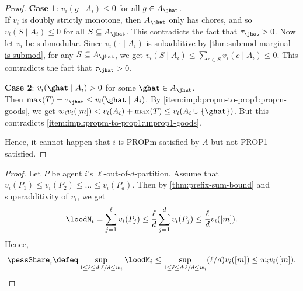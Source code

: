 \begin{proof}
\textbf{Case 1}: $v_i(g \mid A_i) \le 0$ for all $g \in A_{\jhat}$.
\\ If $v_i$ is doubly strictly monotone, then $A_{\jhat}$ only has chores,
and so $v_i(S \mid A_i) \le 0$ for all $S \subseteq A_{\jhat}$.
This contradicts the fact that $\tau_{\jhat} > 0$.
Now let $v_i$ be submodular.
Since $v_i(\cdot \mid A_i)$ is subadditive by \cref{thm:submod-marginal-is-submod},
for any $S \subseteq A_{\jhat}$, we get
$v_i(S \mid A_i) \le \sum_{c \in S} v_i(c \mid A_i) \le 0$.
This contradicts the fact that $\tau_{\jhat} > 0$.

\textbf{Case 2}: $v_i(\ghat \mid A_i) > 0$ for some $\ghat \in A_{\jhat}$.
\\ Then $\max(T) = \tau_{\jhat} \le v_i(\ghat \mid A_i)$.
By \ref{item:impl:propm-to-prop1:propm-goods}, we get
$w_iv_i([m]) < v_i(A_i) + \max(T) \le v_i(A_i \cup \{\ghat\})$.
But this contradicts \ref{item:impl:propm-to-prop1:unprop1-goods}.

Hence, it cannot happen that $i$ is PROPm-satisfied by $A$ but not PROP1-satisfied.
\end{proof}

\begin{proof}
Let $P$ be agent $i$'s $\ell$-out-of-$d$-partition.
Assume \wLoG{} that $v_i(P_1) \le v_i(P_2) \le \ldots \le v_i(P_d)$.
Then by \cref{thm:prefix-sum-bound} and superadditivity of $v_i$, we get
\[ \loodM_i = \sum_{j=1}^{\ell} v_i(P_j)
    \le \frac{\ell}{d}\sum_{j=1}^d v_i(P_j) \le \frac{\ell}{d}v_i([m]). \]
Hence,
\[ \pessShare_i \defeq \sup_{1 \le \ell \le d: \ell/d \le w_i} \loodM_i
    \le \sup_{1 \le \ell \le d: \ell/d \le w_i} (\ell/d)v_i([m]) \le w_iv_i([m]).
    \qedhere \]
\end{proof}
